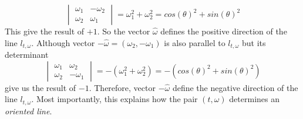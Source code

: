 \documentclass[a4paper]{article}
\begin{document}
\[\begin{vmatrix}
    \omega_1 & -\omega_2\\
    \omega_2 & \omega_1 
\end{vmatrix}
= \omega_1^2 + \omega_2^2 = cos(\theta)^2 + sin(\theta)^2\]
This give the result of $+1$. So the vector $\hat{\omega}$ defines the positive direction of the line $l_{t,\omega}$.
Although vector $-\hat{\omega} = (\omega_2,-\omega_1)$ is also parallel to $l_{t,\omega}$ but its determinant
\[
    \begin{vmatrix}
        \omega_1 & \omega_2\\
        \omega_2 & -\omega_1 
    \end{vmatrix}
= - (\omega_1^2 + \omega_2^2) = -(cos(\theta)^2 + sin(\theta)^2)\]
give us the result of $-1$. Therefore, vector $-\hat{\omega}$ define the negative direction of the line $l_{t,\omega}$. Most importantly, this explains how the pair $(t,\omega)$ determines an \textit{oriented line}. 
\end{document}
